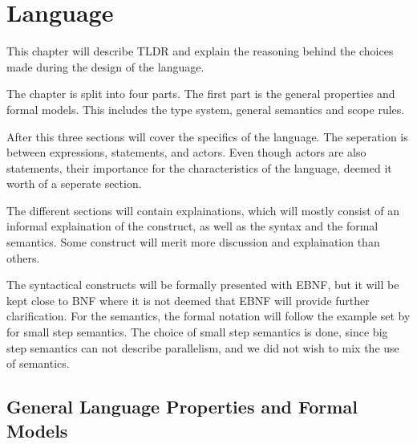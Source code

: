 \chapter{Language}\label{part:design}

This chapter will describe TLDR and explain the reasoning behind the choices made during the design of the language.

The chapter is split into four parts. The first part is the general properties and formal models. This includes the type system, general semantics and scope rules.

After this three sections will cover the specifics of the language. The seperation is between expressions, statements, and actors. Even though actors are also statements, their importance for the characteristics of the language, deemed it worth of a seperate section.

The different sections will contain explainations, which will mostly consist of an informal explaination of the construct, as well as the syntax and the formal semantics. Some construct will merit more discussion and explaination than others.

The syntactical constructs will be formally presented with EBNF, but it will be kept close to BNF where it is not deemed that EBNF will provide further clarification. For the semantics, the formal notation will follow the example set by  for small step semantics. The choice of small step semantics is done, since big step semantics can not describe parallelism, and we did not wish to mix the use of semantics.

\section{General Language Properties and Formal Models}






